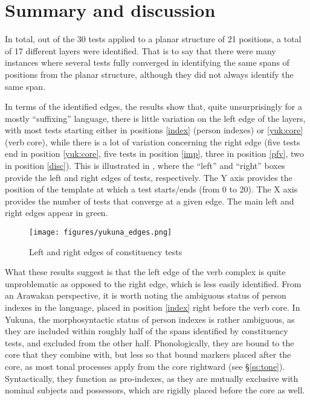 \documentclass[output=paper]{langscibook}
\begin{document}
\section{Summary and discussion} %
\label{sec:yuk:summary}

In total, out of the 30 tests applied to a planar structure of 21 positions, a total of 17 different layers were identified. That is to say that there were many instances where several tests fully converged in identifying the same spans of positions from the planar structure, although they did not always identify the same span.

In terms of the identified edges, the results show that, quite unsurprisingly for a mostly ``suffixing'' language, there is little variation on the left edge of the layers, with most tests starting either in positions \ref{index} (person indexes) or \ref{yuk:core} (verb core), while there is a lot of variation concerning the right edge (five tests end in position \ref{yuk:core}, five tests in position \ref{imp}, three in position \ref{pfv}, two in position \ref{disc}). This is illustrated in , where the ``left'' and ``right'' boxes provide the left and right edges of tests, respectively. The Y axis provides the position of the template at which a test starts/ends (from 0 to 20). The X axis provides the number of tests that converge at a given edge. The main left and right edges appear in green.

\begin{figure}
\centering
\texttt{[image: figures/yukuna\_edges.png]}
\caption{Left and right edges of constituency tests}
\label{fig:5}
\end{figure}

\largerpage
What these results suggest is that the left edge of the verb complex is quite unproblematic as opposed to the right edge, which is less easily identified. From an Arawakan perspective, it is worth noting the ambiguous status of person indexes in the language, placed in position \ref{index} right before the verb core. 
In Yukuna, the morphosyntactic status of person indexes is rather ambiguous, as they are included within roughly half of the spans identified by constituency tests, and excluded from the other half. Phonologically, they are bound to the core that they combine with, but less so that bound markers placed after the core, as most tonal processes apply from the core rightward (see §\ref{ss:tone}). Syntactically, they function as pro-indexes, as they are mutually exclusive with nominal subjects and possessors, which are rigidly placed before the core as well.
\end{document}
